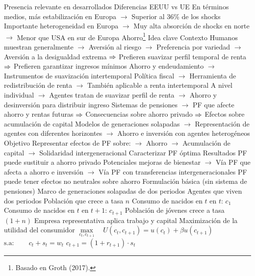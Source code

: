 \documentclass{nuevotema}
\begin{document}
\begin{esquemal}
				\4[] Presencia relevante en desarrollados
				\4 Diferencias EEUU vs UE
				\4[] En términos medios, más estabilización en Europa
				\4[] $\to$ Superior al 36\% de los shocks
				\4[] Importante heterogeneidad en Europa
				\4[] $\to$ Muy alta absorción de shocks en norte
				\4[] $\to$ Menor que USA en sur de Europa
	\1 
		\2 Ahorro\footnote{Basado en Groth (2017).}
			\3 Idea clave
				\4 Contexto
				\4[] Humanos muestran generalmente
				\4[] $\to$ Aversión al riesgo
				\4[] $\to$ Preferencia por variedad
				\4[] $\to$ Aversión a la desigualdad extrema
				\4[] $\Rightarrow$ Prefieren suavizar perfil temporal de renta
				\4[] $\Rightarrow$ Prefieren garantizar ingresos mínimos
				\4[] Ahorro y endeudamiento
				\4[] $\to$ Instrumentos de suavización intertemporal
				\4[] Política fiscal
				\4[] $\to$ Herramienta de redistribución de renta
				\4[] $\to$ También aplicable a renta intertemporal
				\4[] A nivel individual
				\4[] $\to$ Agentes tratan de suavizar perfil de renta
				\4[] $\to$ Ahorro y desinversión para distribuir ingreso
				\4[] Sistemas de pensiones
				\4[] $\to$ PF que afecte ahorro y rentas futuras
				\4[] $\Rightarrow$ Consecuencias sobre ahorro privado
				\4[] $\Rightarrow$ Efectos sobre acumulación de capital
				\4[] Modelos de generaciones solapadas
				\4[] $\to$ Representación de agentes con diferentes horizontes
				\4[] $\to$ Ahorro e inversión con agentes heterogéneos
				\4 Objetivo
				\4[] Representar efectos de PF sobre:
				\4[] $\to$ Ahorro
				\4[] $\to$ Acumulación de capital
				\4[] $\to$ Solidaridad intergeneracional
				\4[] Caracterizar PF óptima
				\4 Resultados
				\4[] PF puede sustituir a ahorro privado
				\4[] Potenciales mejoras de bienestar
				\4[] $\to$ Vía PF que afecta a ahorro e inversión
				\4[] $\to$ Vía PF con transferencias intergeneracionales
				\4[] PF puede tener efectos no neutrales sobre ahorro
			\3 Formulación básica (sin sistema de pensiones)
				\4 Marco de generaciones solapadas de dos periodos
				\4[] Agentes que viven dos periodos
				\4[] Población que crece a tasa $n$
				\4[] Consumo de nacidos en $t$ en $t$: $c_{1}$
				\4[] Consumo de nacidos en $t$ en $t+1$: $c_{t+1}$
				\4 Población de jóvenes crece a tasa $(1+n)$
				\4 Empresa representativa aplica trabajo y capital
				\4 Maximización de la utilidad del consumidor
				\4[] $\underset{c_t, c_{t+1}}{\max} \quad U(c_{t}, c_{t+1}) = u(c_{t})+\beta u(c_{t+1})$
				\4[] \quad $\text{s.a}: \quad \quad c_{t} + s_t = w_t$
				\4[] \quad \quad \quad \quad \quad $c_{t+1}=(1+r_{t+1}) \cdot s_t$

\end{esquemal}
\end{document}
